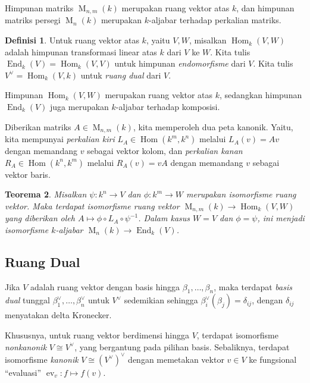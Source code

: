 \documentclass[12pt]{article}
\theoremstyle{plain}
\newtheorem{theorem}{Teorema}[section]
\theoremstyle{definition}
\newtheorem{definition}[theorem]{Definisi}
\theoremstyle{remark}
\numberwithin{equation}{section}
\begin{document}
Himpunan matriks $\operatorname{M}_{n,m}(k)$ merupakan ruang vektor atas $k$,
dan himpunan matriks persegi $\operatorname{M}_n(k)$ merupakan $k$-aljabar
terhadap perkalian matriks.

\begin{definition}
Untuk ruang vektor atas $k$, yaitu $V,W$, misalkan
$\operatorname{Hom}_k(V,W)$ adalah himpunan transformasi linear atas $k$
dari $V$ ke $W$.
Kita tulis $\operatorname{End}_k(V) = \operatorname{Hom}_k(V,V)$
untuk himpunan \emph{endomorfisme} dari $V$.
Kita tulis $V^\vee = \operatorname{Hom}_k(V,k)$
untuk \emph{ruang dual} dari $V$.
\end{definition}

Himpunan $\operatorname{Hom}_k(V,W)$ merupakan ruang vektor atas $k$, sedangkan
himpunan $\operatorname{End}_k(V)$ juga merupakan $k$-aljabar terhadap komposisi.

Diberikan matriks $A \in \operatorname{M}_{n,m}(k)$, kita memperoleh
dua peta kanonik.
Yaitu, kita mempunyai \emph{perkalian kiri}
$L_A \in \operatorname{Hom}(k^m,k^n)$ melalui $L_A(v)=Av$
dengan memandang $v$ sebagai vektor kolom,
dan \emph{perkalian kanan}
$R_A \in \operatorname{Hom}(k^n,k^m)$ melalui $R_A(v)=vA$
dengan memandang $v$ sebagai vektor baris.

\begin{theorem}
Misalkan $\psi: k^n \to V$ dan $\phi : k^m \to W$ merupakan isomorfisme
ruang vektor.
Maka terdapat isomorfisme ruang vektor
$\operatorname{M}_{n,m}(k) \to \operatorname{Hom}_k(V,W)$ yang diberikan oleh
$A \mapsto \phi \circ L_A \circ \psi^{-1}$.
Dalam kasus $W=V$ dan $\phi=\psi$, ini menjadi isomorfisme $k$-aljabar
$\operatorname{M}_n(k) \to \operatorname{End}_k(V)$.
\end{theorem}

\subsection{Ruang Dual}

Jika $V$ adalah ruang vektor dengan basis hingga
$\beta_1, \ldots, \beta_n$, maka terdapat \emph{basis dual} tunggal
$\beta^\vee_1, \ldots, \beta^\vee_n$
untuk $V^\vee$ sedemikian sehingga $\beta_i^\vee(\beta_j)=\delta_{ij}$,
dengan $\delta_{ij}$ menyatakan delta Kronecker.

Khususnya, untuk ruang vektor berdimensi hingga $V$,
terdapat isomorfisme \emph{nonkanonik} $V \cong V^\vee$,
yang bergantung pada pilihan basis.
Sebaliknya, terdapat isomorfisme \emph{kanonik}
$V \cong (V^\vee)^\vee$ dengan memetakan vektor $v \in V$ ke
fungsional “evaluasi” $\operatorname{ev}_v : f \mapsto f(v)$. 
\end{document}
